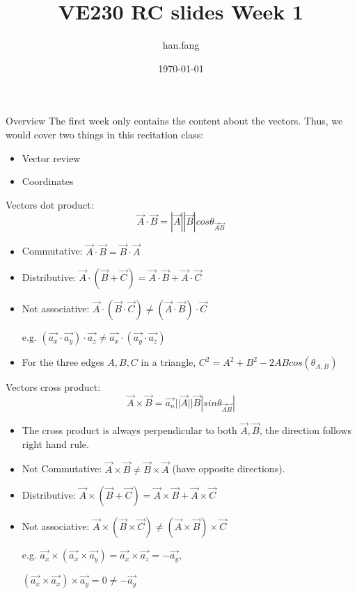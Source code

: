 \documentclass[xcolor={dvipsnames}]{beamer}
\title[VE230 RC slides week 1]{VE230 RC slides Week 1}
\author{han.fang }
\date{\today}
\begin{document}
\begin{frame}
\titlepage
\end{frame}
\begin{frame}{Overview}
The first week only contains the content about the vectors. Thus, we would cover two things in this recitation class:
\newline
\begin{itemize}
	\item Vector review
	\item Coordinates
\end{itemize}
\end{frame}
\begin{frame}{Vectors}
dot product:
    $$
    \vec{A} \cdot \vec{B} = |\vec{A}||\vec{B}|cos\theta_{\vec{A}\vec{B}}
    $$
    \begin{itemize}
        \item Commutative: $\vec{A}\cdot\vec{B} = \vec{B}\cdot\vec{A}$
        \item Distributive: $\vec{A}\cdot(\vec{B} + \vec{C}) = \vec{A}\cdot\vec{B}+\vec{A}\cdot\vec{C}$
        \item Not associative: $\vec{A}\cdot(\vec{B}\cdot\vec{C}) \neq (\vec{A}\cdot\vec{B})\cdot\vec{C}$ 
        
        e.g. $(\vec{a_x}\cdot\vec{a_y})\cdot\vec{a_z} \neq \vec{a_x}\cdot(\vec{a_y}\cdot\vec{a_z})$
        \item For the three edges $A,B,C$ in a triangle, $C^2 = A^2 + B^2 - 2ABcos(\theta_{A,B})$
    \end{itemize}
\end{frame}
\begin{frame}{Vectors}
cross product:
    $$
    \vec{A}\times\vec{B} = \vec{a_n}||\vec{A}||\vec{B}|sin\theta_{\vec{A}\vec{B}}|
    $$
    \begin{itemize}
        \item The cross product is always perpendicular to both $\vec{A}, \vec{B}$, the direction follows right hand rule.
        \item Not Commutative: $\vec{A}\times\vec{B}\neq\vec{B}\times\vec{A}$ (have opposite directions).
        \item Distributive: $\vec{A}\times(\vec{B}+\vec{C}) = \vec{A}\times\vec{B} + \vec{A}\times\vec{C}$
        \item Not associative: $\vec{A}\times(\vec{B}\times\vec{C}) \neq (\vec{A}\times\vec{B})\times\vec{C}$
        
        e.g. $\vec{a_x}\times(\vec{a_x}\times\vec{a_y}) = \vec{a_x}\times\vec{a_z} = -\vec{a_y}$, 

        $(\vec{a_x}\times\vec{a_x})\times\vec{a_y} = 0\neq -\vec{a_y}$
    \end{itemize}
\end{frame}
\end{document}
